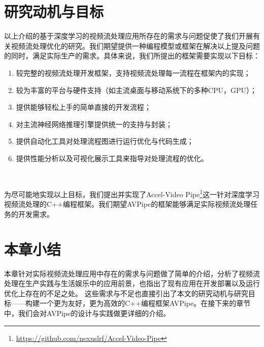 \section{研究动机与目标}\label{moti_obj}
以上介绍的基于深度学习的视频流处理应用所存在的需求与问题促使了我们开展有关视频流处理优化的研究。我们期望提供一种编程模型或框架在解决以上提及问题的同时，满足实际生产的需求。具体来说，我们所提出的框架需要实现以下目标：
\begin{enumerate}
    \item 较完整的视频流处理开发框架，支持视频流处理每一流程在框架内的实现；
    \item 较为丰富的平台与硬件支持（如主流桌面与移动系统下的多种CPU，GPU）；
    \item 提供能够轻松上手的简单直接的开发流程；
    \item 对主流神经网络推理引擎提供统一的支持与封装；
    \item 提供自动化工具对处理流程图进行运行优化与代码生成；
    \item 提供性能分析以及可视化展示工具来指导对处理流程的优化。
\end{enumerate}\par~\par
为尽可能地实现以上目标，我们提出并实现了Accel-Video Pipe\footnote{\url{https://github.com/nexuslrf/Accel-Video-Pipe}}这一针对深度学习视频流处理的C++编程框架。我们期望AVPipe的框架能够满足实际视频流处理任务的开发需求。

\section{本章小结}
本章针对实际视频流处理应用中存在的需求与问题做了简单的介绍，分析了视频流处理在生产实践与生活娱乐中的应用前景，也指出了现有应用在开发部署以及运行优化上存在的不足之处。
这些需求与不足也直接引出了本文的研究动机与研究目标——构建一个更为友好，更为高效的C++编程框架AVPipe。在接下来的章节中，我们会对AVPipe的设计与实践做更详细的介绍。